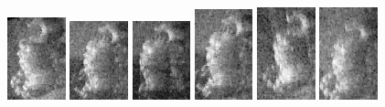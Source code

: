 \begin{figure}
    \includegraphics[width=0.15\textwidth]{chapters/images/dataset/all-class-images/hook/hook-5.jpg}    
    \includegraphics[width=0.15\textwidth]{chapters/images/dataset/all-class-images/hook/hook-30.jpg}
    \includegraphics[width=0.15\textwidth]{chapters/images/dataset/all-class-images/hook/hook-41.jpg}
    \includegraphics[width=0.15\textwidth]{chapters/images/dataset/all-class-images/hook/hook-29.jpg}
    \includegraphics[width=0.15\textwidth]{chapters/images/dataset/all-class-images/hook/hook-13.jpg}
    \includegraphics[width=0.15\textwidth]{chapters/images/dataset/all-class-images/hook/hook-18.jpg}    
    

\end{figure}
